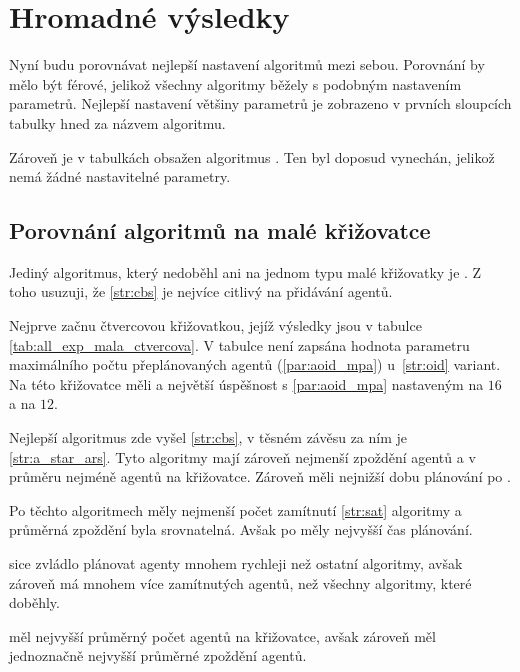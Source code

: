 \section{Hromadné výsledky}\label{sec:hromadne_vysledky}

%

Nyní budu porovnávat nejlepší nastavení algoritmů mezi sebou.
Porovnání by mělo být férové, jelikož všechny algoritmy běžely s podobným nastavením parametrů.
Nejlepší nastavení většiny parametrů je zobrazeno v prvních sloupcích tabulky hned za názvem algoritmu.

Zároveň je v tabulkách obsažen algoritmus .
Ten byl doposud vynechán, jelikož nemá žádné nastavitelné parametry.

\subsection{Porovnání algoritmů na malé křižovatce}\label{subsec:porovnani_algoritmu_na_male_krizovatce}

Jediný algoritmus, který nedoběhl ani na jednom typu malé křižovatky je .
Z toho usuzuji, že \ref{str:cbs} je nejvíce citlivý na přidávání agentů.


Nejprve začnu čtvercovou křižovatkou, jejíž výsledky jsou v tabulce \ref{tab:all_exp_mala_ctvercova}.
V tabulce není zapsána hodnota parametru maximálního počtu přeplánovaných agentů (\ref{par:aoid_mpa}) u~\ref{str:oid} variant.
Na této křižovatce měli  a 
největší úspěšnost s \ref{par:aoid_mpa} nastaveným na $16$ a  na $12$.

Nejlepší algoritmus zde vyšel \ref{str:cbs}, v těsném závěsu za ním je \ref{str:a_star_ars}.
Tyto algoritmy mají zároveň nejmenší zpoždění agentů a v průměru nejméně agentů na křižovatce.
Zároveň měli nejnižší dobu plánování po .

Po těchto algoritmech měly nejmenší počet zamítnutí \ref{str:sat} algoritmy a průměrná zpoždění byla srovnatelná.
Avšak po  měly nejvyšší čas plánování.

 sice zvládlo plánovat agenty mnohem rychleji než ostatní algoritmy,
avšak zároveň má mnohem více zamítnutých agentů, než všechny algoritmy, které doběhly.

 měl nejvyšší průměrný počet agentů na křižovatce,
avšak zároveň měl jednoznačně nejvyšší průměrné zpoždění agentů.

